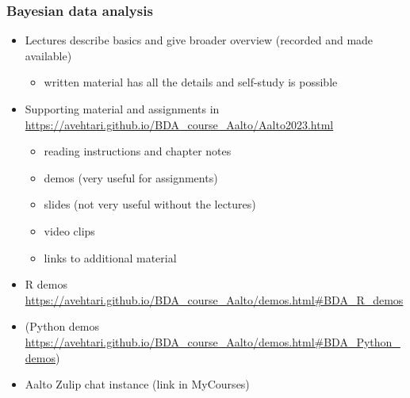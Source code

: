 \documentclass[english,t]{beamer}
\begin{document}
\begin{frame}
  \frametitle{Bayesian data analysis}  %

  \begin{itemize}
  \item Lectures describe basics and give broader overview (recorded
    and made available)
    \begin{itemize}
    \item written material has all the details and self-study
      is possible
    \end{itemize}
  \item Supporting material and assignments in
    {\small\url{https://avehtari.github.io/BDA_course_Aalto/Aalto2023.html}}
    \begin{itemize}
    \item reading instructions and chapter notes
    \item demos (very useful for assignments)
    \item slides (not very useful without the lectures)
    \item video clips
    \item links to additional material
    \end{itemize}
   \item R demos {\small\url{https://avehtari.github.io/BDA_course_Aalto/demos.html\#BDA_R_demos}}
  \item (Python demos {\small\url{https://avehtari.github.io/BDA_course_Aalto/demos.html\#BDA_Python_demos})}
  \item Aalto Zulip chat instance (link in MyCourses)
  \end{itemize}

\end{frame}
\end{document}
